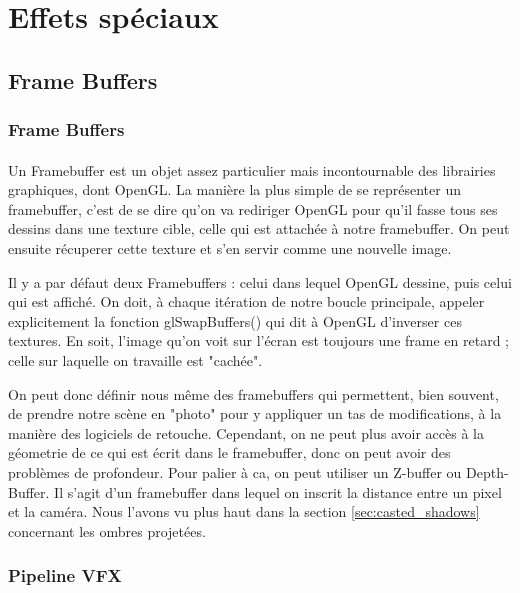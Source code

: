 \documentclass{EPUProjetDi}
\begin{document}
\section{Effets spéciaux}

\subsection{Frame Buffers} %
\subsubsection{Frame Buffers} %

\label{sec:framebuffers}


\paragraph{}
Un Framebuffer est un objet assez particulier mais incontournable des librairies graphiques, dont OpenGL.
La manière la plus simple de se représenter un framebuffer, c'est de se dire qu'on va rediriger OpenGL pour qu'il fasse tous ses dessins dans une texture cible, celle qui est attachée à notre framebuffer. On peut ensuite récuperer cette texture et s'en servir comme une nouvelle image.

Il y a par défaut deux Framebuffers : celui dans lequel OpenGL dessine, puis celui qui est affiché. On doit, à chaque itération de notre boucle principale, appeler explicitement la fonction glSwapBuffers() qui dit à OpenGL d'inverser ces textures.
En soit, l'image qu'on voit sur l'écran est toujours une frame en retard ; celle sur laquelle on travaille est "cachée".

On peut donc définir nous même des framebuffers qui permettent, bien souvent, de prendre notre scène en "photo" pour y appliquer un tas de modifications, à la manière des logiciels de retouche.
Cependant, on ne peut plus avoir accès à la géometrie de ce qui est écrit dans le framebuffer, donc on peut avoir des problèmes de profondeur.
Pour palier à ca, on peut utiliser un Z-buffer ou Depth-Buffer. Il s'agit d'un framebuffer dans lequel on inscrit la distance entre un pixel et la caméra. Nous l'avons vu plus haut dans la section \ref{sec:casted_shadows} concernant les ombres projetées.



\subsubsection{Pipeline VFX} %
\end{document}
